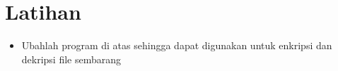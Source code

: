 \documentclass{article}
\begin{document}

\section*{Latihan}

\begin{itemize}
    \item Ubahlah program di atas sehingga dapat digunakan untuk enkripsi dan dekripsi file sembarang
\end{itemize}
\end{document}
